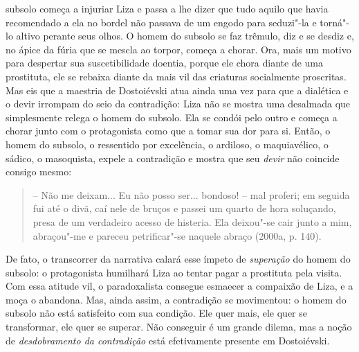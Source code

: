 {{subsolo começa a injuriar Liza e passa a lhe dizer que tudo aquilo que
havia recomendado a ela no bordel não passava de um engodo para
seduzi"-la e torná"-lo altivo perante seus olhos. O homem do subsolo se
faz trêmulo, diz e se desdiz e, no ápice da fúria que se mescla ao
torpor, começa a chorar. Ora, mais um motivo para despertar sua
suscetibilidade doentia, porque ele chora diante de uma prostituta, ele
se rebaixa diante da mais vil das criaturas socialmente proscritas. Mas
eis que a maestria de Dostoiévski atua ainda uma vez para que a
dialética e o devir irrompam do seio da contradição: Liza não se mostra
uma desalmada que simplesmente relega o homem do subsolo. Ela se condói
pelo outro e começa a chorar junto com o protagonista como que a tomar
sua dor para si. Então, o homem do subsolo, o ressentido por excelência,
o ardiloso, o maquiavélico, o sádico, o masoquista, expele a contradição
e mostra que seu \emph{devir} não coincide consigo mesmo:

\begin{quote}
-- Não me deixam... Eu não posso ser... bondoso! -- mal proferi; em
seguida fui até o divã, caí nele de bruços e passei um quarto de hora
soluçando, presa de um verdadeiro acesso de histeria. Ela deixou"-se cair
junto a mim, abraçou"-me e pareceu petrificar"-se naquele abraço (2000a,
p. 140).
\end{quote}

De fato, o transcorrer da narrativa calará esse ímpeto de
\emph{superação} do homem do subsolo: o protagonista humilhará Liza ao
tentar pagar a prostituta pela visita. Com essa atitude vil, o
paradoxalista consegue esmaecer a compaixão de Liza, e a moça o
abandona. Mas, ainda assim, a contradição se movimentou: o homem do
subsolo não está satisfeito com sua condição. Ele quer mais, ele quer se
transformar, ele quer se superar. Não conseguir é um grande dilema, mas
a noção de \emph{desdobramento da contradição} está efetivamente
presente em Dostoiévski.

}}
